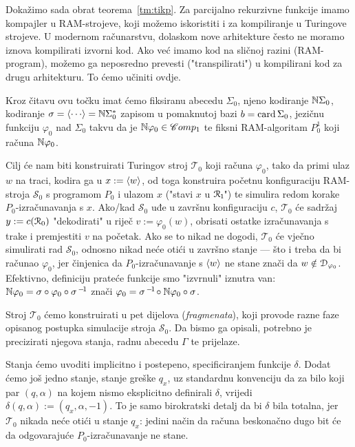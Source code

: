 Dokažimo sada obrat teorema~\ref{tm:tikp}. Za parcijalno rekurzivne funkcije imamo kompajler u RAM-strojeve, koji možemo iskoristiti i za kompiliranje u Turingove strojeve. U modernom računarstvu, dolaskom nove arhitekture često ne moramo iznova kompilirati izvorni kod. Ako već imamo kod na sličnoj razini (RAM-program), možemo ga neposredno prevesti ("transpilirati") u kompilirani kod za drugu arhitekturu. To ćemo učiniti ovdje.

Kroz čitavu ovu točku imat ćemo fiksiranu abecedu $\Sigma_0$, njeno kodiranje ${\mathbb N}\Sigma_0$, kodiranje $\sigma=\kr{\cdots}=\N\Sigma_0^*$ zapisom u pomaknutoj bazi $b=\operatorname{card}\Sigma_0$, jezičnu funkciju $\varphi_0$ nad $\Sigma_0$ takvu da je ${\mathbb N}\varphi_0\in\mathscr Comp_1$ te fiksni RAM-algoritam $P_0^1$ koji računa ${\mathbb N}\varphi_0$.

Cilj će nam biti konstruirati Turingov stroj $\mathcal T_0$ koji računa $\varphi_0$, tako da primi ulaz $w$ na traci, kodira ga u $x:=\langle w\rangle$, od toga konstruira početnu konfiguraciju RAM-stroja $\mathcal S_0$ s programom $P_0$ i ulazom $x$ ("\hspace{0.1pt}stavi $x$ u $\mathcal R_{\mspace{-1mu}1}\mspace{-2mu}$") te simulira redom korake $P_0$-izračunavanja s $x$. Ako\slash kad $\mathcal S_0$ uđe u završnu konfiguraciju $c$, $\mathcal T_0$ će sadržaj $y:=c(\mathcal R_{0})$ "dekodirati" u riječ $v:=\varphi_0(w)$, obrisati ostatke izračunavanja s trake i premjestiti $v$ na početak. Ako se to nikad ne dogodi, $\mathcal T_0$ će vječno simulirati rad $\mathcal S_0$, odnosno nikad neće otići u završno stanje --- što i treba da bi računao $\varphi_0$, jer činjenica da $P_0$-izračunavanje s $\langle w\rangle$ ne stane znači da $w\notin\mathcal D_{\varphi_0}$. Efektivno, definiciju prateće funkcije smo "izvrnuli" iznutra van: ${\mathbb N}\varphi_0=\sigma\circ\varphi_0\circ\sigma^{\,-\!1}$ znači $\varphi_0=\sigma^{\,-\!1}\mspace{-2mu}\circ{\mathbb N}\varphi_0\circ\sigma$.

Stroj $\mathcal T_0$ ćemo konstruirati u pet dijelova (\emph{fragmenata}), koji provode razne faze opisanog postupka simulacije stroja $\mathcal S_0$. Da bismo ga opisali, potrebno je precizirati njegova stanja, radnu abecedu $\Gamma$ te prijelaze.

Stanja ćemo uvoditi implicitno i postepeno, specificiranjem funkcije $\delta$. Dodat ćemo još jedno stanje, stanje greške $q_x$, uz standardnu konvenciju da za bilo koji par $(q,\alpha)$ na kojem nismo eksplicitno definirali $\delta$, vrijedi $\delta(q,\alpha):=(q_x,\alpha,-1)$. To je samo birokratski detalj da bi $\delta$ bila totalna, jer $\mathcal T_0$ nikada neće otići u stanje $q_x$: jedini način da računa beskonačno dugo bit će da odgovarajuće $P_0$-izračunavanje ne stane.

